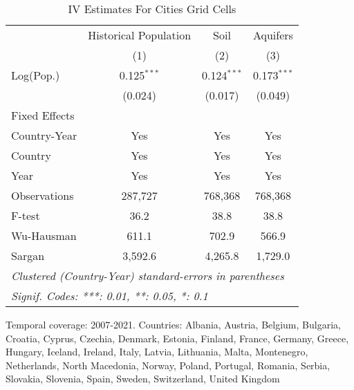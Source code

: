 
\begin{table}[htbp]
   \caption{\label{tab:within_lez_iv_all} IV Estimates For Cities Grid Cells}
   \centering
   \small
   \begin{tabular}{lccc}
      \tabularnewline \midrule \midrule
                   & Historical Population & Soil          & Aquifers \\   
                   & (1)                   & (2)           & (3)\\  
      Log(Pop.)    & 0.125$^{***}$         & 0.124$^{***}$ & 0.173$^{***}$\\   
                   & (0.024)               & (0.017)       & (0.049)\\   
      Fixed Effects\\
      Country-Year & Yes                   & Yes           & Yes\\  
      Country      & Yes                   & Yes           & Yes\\  
      Year         & Yes                   & Yes           & Yes\\  
      \midrule 
      Observations & 287,727               & 768,368       & 768,368\\  
      F-test       & 36.2                  & 38.8          & 38.8\\  
      Wu-Hausman   & 611.1                 & 702.9         & 566.9\\  
      Sargan       & 3,592.6               & 4,265.8       & 1,729.0\\  
      \midrule \midrule
      \multicolumn{4}{l}{\emph{Clustered (Country-Year) standard-errors in parentheses}}\\
      \multicolumn{4}{l}{\emph{Signif. Codes: ***: 0.01, **: 0.05, *: 0.1}}\\
   \end{tabular}
   
   \par \raggedright 
   Temporal coverage: 2007-2021. Countries: Albania, Austria, Belgium, Bulgaria, Croatia, Cyprus, Czechia, Denmark, Estonia, Finland, France, Germany, Greece, Hungary, Iceland, Ireland, Italy, Latvia, Lithuania, Malta, Montenegro, Netherlands, North Macedonia, Norway, Poland, Portugal, Romania, Serbia, Slovakia, Slovenia, Spain, Sweden, Switzerland, United Kingdom
\end{table}


